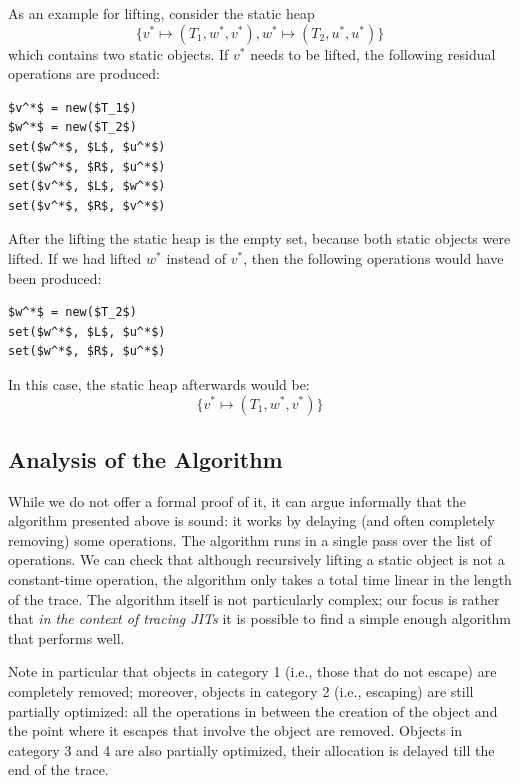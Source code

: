 \documentclass{sigplanconf}
\newcommand\ie{i.e.,\xspace}
\begin{document}
As an example for lifting, consider the static heap $$\{v^* \mapsto (T_1, w^*,
v^*), w^* \mapsto (T_2, u^*, u^*)\}$$ which contains two static objects. If $v^*$
needs to be lifted, the following residual operations are produced:

\begin{lstlisting}[mathescape,xleftmargin=20pt,basicstyle=\setstretch{1.1}\ttfamily\scriptsize]
$v^*$ = new($T_1$)
$w^*$ = new($T_2$)
set($w^*$, $L$, $u^*$)
set($w^*$, $R$, $u^*$)
set($v^*$, $L$, $w^*$)
set($v^*$, $R$, $v^*$)
\end{lstlisting}

After the lifting the static heap is the empty set, because both static objects
were lifted.
If we had lifted $w^*$ instead of $v^*$, then the following operations would
have been produced:

\begin{lstlisting}[mathescape,xleftmargin=20pt,basicstyle=\setstretch{1.1}\ttfamily\scriptsize]
$w^*$ = new($T_2$)
set($w^*$, $L$, $u^*$)
set($w^*$, $R$, $u^*$)
\end{lstlisting}

In this case, the static heap afterwards would be:
$$\{v^* \mapsto (T_1, w^*, v^*)\}$$




\subsection{Analysis of the Algorithm}
\label{sub:analysis}

While we do not offer a formal proof of it, it can argue informally
that the algorithm presented above is sound: it works by delaying (and
often completely removing) some operations.  The algorithm runs in a
single pass over the list of operations.  We can check that although
recursively lifting a static object is not a constant-time operation,
the algorithm only takes a total time linear in the length of the trace.
The algorithm itself is not particularly complex; our focus is
rather that \emph{in the context of tracing JITs} it is possible to find a
simple enough algorithm that performs well.

Note in particular that objects in category 1 (\ie those that do
not escape) are completely removed; moreover, objects in category 2
(\ie escaping) are still partially optimized: all the operations in between the
creation of the object and the point where it escapes that involve the object
are removed. Objects in category 3 and 4 are also partially optimized, their
allocation is delayed till the end of the trace.
\end{document}
